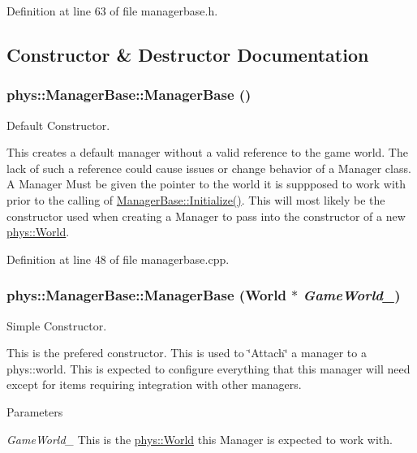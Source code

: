 Definition at line 63 of file managerbase.h.



\subsection{Constructor \& Destructor Documentation}
\hypertarget{classphys_1_1ManagerBase_a80c0d01d0dc19511cd08fc6ac805a616}{
\subsubsection[{ManagerBase}]{\setlength{\rightskip}{0pt plus 5cm}phys::ManagerBase::ManagerBase ()}}
\label{d2/de3/classphys_1_1ManagerBase_a80c0d01d0dc19511cd08fc6ac805a616}


Default Constructor. 

This creates a default manager without a valid reference to the game world. The lack of such a reference could cause issues or change behavior of a Manager class. A Manager Must be given the pointer to the world it is suppposed to work with prior to the calling of \hyperlink{classphys_1_1ManagerBase_a57dd8e54e767427d5bdcc86dc66d73ed}{ManagerBase::Initialize()}. This will most likely be the constructor used when creating a Manager to pass into the constructor of a new \hyperlink{classphys_1_1World}{phys::World}. 

Definition at line 48 of file managerbase.cpp.

\hypertarget{classphys_1_1ManagerBase_ab9ad12416f771d95fe8a6d953923c634}{
\subsubsection[{ManagerBase}]{\setlength{\rightskip}{0pt plus 5cm}phys::ManagerBase::ManagerBase ({\bf World} $\ast$ {\em GameWorld\_\-})}}
\label{d2/de3/classphys_1_1ManagerBase_ab9ad12416f771d95fe8a6d953923c634}


Simple Constructor. 

This is the prefered constructor. This is used to \char`\"{}Attach\char`\"{} a manager to a phys::world. This is expected to configure everything that this manager will need except for items requiring integration with other managers. 
\begin{DoxyParams}{Parameters}
\item[{\em GameWorld\_\-}]This is the \hyperlink{classphys_1_1World}{phys::World} this Manager is expected to work with. \end{DoxyParams}


